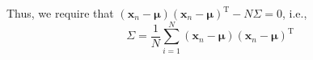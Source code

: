 Thus, we require that
$(\mathbf{x}_{n}-\boldsymbol{\mu})(\mathbf{x}_{n}-\boldsymbol{\mu})^{\mathrm{T}}-N\Sigma=0$,
    i.e.,
\begin{equation}
\Sigma=\frac{1}{N}\sum_{i=1}^{N}(\mathbf{x}_{n}-\boldsymbol{\mu})(\mathbf{x}_{n}-\boldsymbol{\mu})^{\mathrm{T}}
\label{eqn:mlofgaussiancov}
\end{equation}
